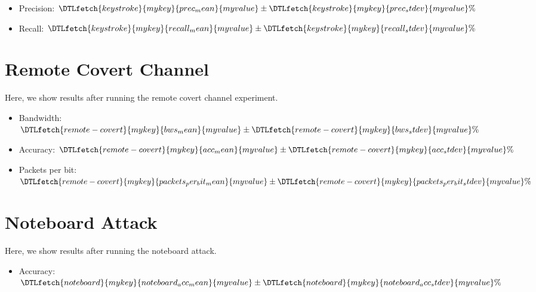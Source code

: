 \documentclass[letterpaper,twocolumn,10pt]{article}
\newcommand{\accessdatfile}[2]{\DTLfetch{#1}{mykey}{#2}{myvalue}}
\begin{document}
\newcommand{\keystrokedata}[1]{\accessdatfile{keystroke}{#1}}
\begin{itemize}
    \item Precision: $\keystrokedata{prec_mean} \pm \keystrokedata{prec_stdev} \%$
    \item Recall: $\keystrokedata{recall_mean} \pm \keystrokedata{recall_stdev} \%$
\end{itemize}

\section{Remote Covert Channel}
Here, we show results after running the remote covert channel experiment.

\newcommand{\remotecovertdata}[1]{\accessdatfile{remote-covert}{#1}}
\begin{itemize}
    \item Bandwidth: $\remotecovertdata{bws_mean} \pm \remotecovertdata{bws_stdev} \% $
    \item Accuracy: $\remotecovertdata{acc_mean} \pm \remotecovertdata{acc_stdev} \% $
    \item Packets per bit: $\remotecovertdata{packets_per_bit_mean} \pm \remotecovertdata{packets_per_bit_stdev} \% $
\end{itemize}


\section{Noteboard Attack}
Here, we show results after running the noteboard attack.
\newcommand{\noteboarddata}[1]{\accessdatfile{noteboard}{#1}}
\begin{itemize}
    \item Accuracy: $\noteboarddata{noteboard_acc_mean} \pm \noteboarddata{noteboard_acc_stdev} \% $
\end{itemize}
\end{document}
